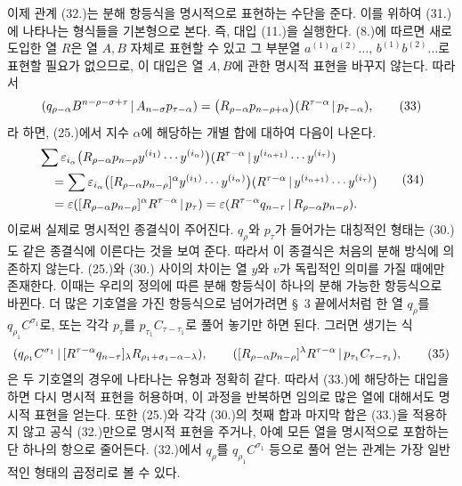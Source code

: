 이제 관계 (32.)는 분해 항등식을 명시적으로 표현하는 수단을 준다. 이를 위하여 (31.)에 나타나는 형식들을 기본형으로 본다. 즉, 대입 (11.)을 실행한다. (8.)에 따르면 새로 도입한 열 $R$은 열 $A,B$ 자체로 표현할 수 있고 그 부분열 $a^{(1)}a^{(2)}\ldots$, $b^{(1)}b^{(2)}\ldots$로 표현할 필요가 없으므로, 이 대입은 열 $A,B$에 관한 명시적 표현을 바꾸지 않는다. 따라서
\begin{equation}
 (q_{\rho-\alpha}B^{n-\rho-\sigma+\tau}\,|\,A_{n-\sigma}p_{\tau-\alpha})
 =\bigl(R_{\rho-\alpha}p_{n-\rho+\alpha}\bigr)
  (R^{\tau-\alpha}\,|\,p_{\tau-\alpha}),
\tag{33}
\end{equation}
라 하면, (25.)에서 지수 $\alpha$에 해당하는 개별 합에 대하여 다음이 나온다.
\begin{equation}
\begin{aligned}
&\sum \varepsilon_{i_\alpha}\bigl(R_{\rho-\alpha}p_{n-\rho}y^{(i_1)}\cdots y^{(i_\alpha)}\bigr)
 (R^{\tau-\alpha}\,|\,y^{(i_{\alpha+1})}\cdots y^{(i_\tau)})\\
&\quad=\sum \varepsilon_{i_\alpha}\bigl([R_{\rho-\alpha}p_{n-\rho}]^\alpha y^{(i_1)}\cdots y^{(i_\alpha)}\bigr)
 (R^{\tau-\alpha}\,|\,y^{(i_{\alpha+1})}\cdots y^{(i_\tau)})\\
&\quad=\varepsilon([R_{\rho-\alpha}p_{n-\rho}]^\alpha R^{\tau-\alpha}\,|\,p_\tau)
 =\varepsilon(R^{\tau-\alpha}q_{n-\tau}\,|\,R_{\rho-\alpha}p_{n-\rho}).
\end{aligned}
\tag{34}
\end{equation}
이로써 실제로 명시적인 종결식이 주어진다. $q_\rho$와 $p_\tau$가 들어가는 대칭적인 형태는 (30.)도 같은 종결식에 이른다는 것을 보여 준다. 따라서 이 종결식은 처음의 분해 방식에 의존하지 않는다. (25.)와 (30.) 사이의 차이는 열 $y$와 $v$가 독립적인 의미를 가질 때에만 존재한다. 이때는 우리의 정의에 따른 분해 항등식이 하나의 분해 가능한 항등식으로 바뀐다. 더 많은 기호열을 가진 항등식으로 넘어가려면 \S\ 3 끝에서처럼 한 열 $q_\rho$를 $q_{\rho_1}C^{\sigma_1}$로, 또는 각각 $p_\tau$를 $p_{\tau_1}C_{\tau-\tau_1}$로 풀어 놓기만 하면 된다. 그러면 생기는 식
\begin{equation}
 (q_{\rho_1}C^{\sigma_1}\,|\,[R^{\tau-\alpha}q_{n-\tau}]_\lambda R_{\rho_1+\sigma_1-\alpha-\lambda}),
 \qquad
 ([R_{\rho-\alpha}p_{n-\rho}]^\lambda R^{\tau-\alpha}\,|\,p_{\tau_1}C_{\tau-\tau_1}),
\tag{35}
\end{equation}
은 두 기호열의 경우에 나타나는 유형과 정확히 같다. 따라서 (33.)에 해당하는 대입을 하면 다시 명시적 표현을 허용하며, 이 과정을 반복하면 임의로 많은 열에 대해서도 명시적 표현을 얻는다. 또한 (25.)와 각각 (30.)의 첫째 합과 마지막 합은 (33.)을 적용하지 않고 공식 (32.)만으로 명시적 표현을 주거나, 아예 모든 열을 명시적으로 포함하는 단 하나의 항으로 줄어든다. (32.)에서 $q_\rho$를 $q_{\rho_1}C^{\sigma_1}$ 등으로 풀어 얻는 관계는 가장 일반적인 형태의 곱정리로 볼 수 있다.

